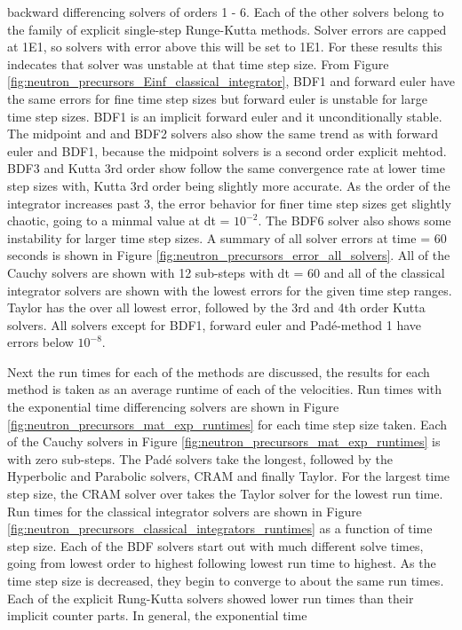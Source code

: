 \noindent backward differencing solvers of orders 1 - 6. Each of the other solvers belong to the family of explicit single-step Runge-Kutta methods. Solver errors are capped at 1E1, so solvers with error above this will be set to 1E1. For these results this indecates that solver was unstable at that time step size. From Figure \ref{fig:neutron_precursors_Einf_classical_integrator}, BDF1 and forward euler have the same errors for fine time step sizes but forward euler is unstable for large time step sizes. BDF1 is an implicit forward euler and it unconditionally stable. The midpoint and and BDF2 solvers also show the same trend as with forward euler and BDF1, because the midpoint solvers is a second order explicit mehtod. BDF3 and Kutta 3rd order show follow the same convergence rate at lower time step sizes with, Kutta 3rd order being slightly more accurate. As the order of the integrator increases past 3, the error behavior for finer time step sizes get slightly chaotic, going to a minmal value at dt = $10^{-2}$. The BDF6 solver also shows some instability for larger time step sizes. A summary of all solver errors at time = 60 seconds is shown in Figure \ref{fig:neutron_precursors_error_all_solvers}. All of the Cauchy solvers are shown with 12 sub-steps with dt = 60 and all of the classical integrator solvers are shown with the lowest errors for the given time step ranges. Taylor has the over all lowest error, followed by the 3rd and 4th order Kutta solvers. All solvers except for BDF1, forward euler and Pad\'e-method 1 have errors below $10^{-8}$.

Next the run times for each of the methods are discussed, the results for each method is taken as an average runtime of each of the velocities. Run times with the exponential time differencing solvers are shown in Figure \ref{fig:neutron_precursors_mat_exp_runtimes} for each time step size taken. Each of the Cauchy solvers in Figure \ref{fig:neutron_precursors_mat_exp_runtimes} is with zero sub-steps. The Pad\'e solvers take the longest, followed by the Hyperbolic and Parabolic solvers, CRAM and finally Taylor. For the largest time step size, the CRAM solver over takes the Taylor solver for the lowest run time. Run times for the classical integrator solvers are shown in Figure \ref{fig:neutron_precursors_classical_integrators_runtimes} as a function of time step size. Each of the BDF solvers start out with much different solve times, going from lowest order to highest following lowest run time to highest. As the time step size is decreased, they begin to converge to about the same run times. Each of the explicit Rung-Kutta solvers showed lower run times than their implicit counter parts. In general, the exponential time 

